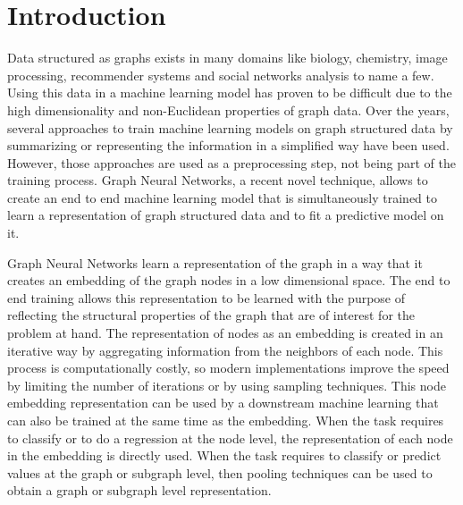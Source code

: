 \newpage
\section{Introduction}


Data structured as graphs exists in many domains like biology, chemistry, image processing, recommender systems and social networks analysis to name a few. Using this data in a machine learning model has proven to be difficult due to the high dimensionality and non-Euclidean properties of graph data. Over the years, several approaches to train machine learning models on graph structured data by summarizing or representing the information in a simplified way have been used. However, those approaches are used as a preprocessing step, not being part of the training process. Graph Neural Networks, a recent novel technique, allows to create an end to end machine learning model that is simultaneously trained to learn a representation of graph structured data and to fit a predictive model on it. 


Graph Neural Networks \cite{scarcelli} learn a representation of the graph in a way that it creates an embedding of the graph nodes in a low dimensional space. The end to end training allows this representation to be learned with the purpose of reflecting the structural properties of the graph that are of interest for the problem at hand. The representation of nodes as an embedding is created in an iterative way by aggregating information from the neighbors of each node. This process is computationally costly, so modern implementations improve the speed by limiting the number of iterations or by using sampling techniques. 
This node embedding representation can be used by a downstream machine learning that can also be trained at the same time as the embedding. When the task requires to classify or to do a regression at the node level, the representation of each node in the embedding is directly used. When the task requires to classify or predict values at the graph or subgraph level, then pooling techniques can be used to obtain a graph or subgraph level representation.

